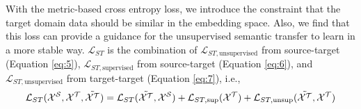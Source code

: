 With the metric-based cross entropy loss, we introduce the constraint that the target domain data should be similar in the embedding space. 
Also, we find that this loss can provide a guidance for the unsupervised semantic transfer to learn in a more stable way.
$\mathcal{L}_{ST}$ is the combination of $\mathcal{L}_{ST, \text{unsupervised}}$ from source-target (Equation \ref{eq:5}), $\mathcal{L}_{ST, \text{supervised}}$ from source-target (Equation \ref{eq:6}), and $\mathcal{L}_{ST, \text{unsupervised}}$ from target-target (Equation \ref{eq:7}), i.e.,
\begin{eqnarray}
\mathcal{L}_{ST}(\mathcal{X}^{\mathcal{S}}, \mathcal{X}^{\mathcal{T}}, \tilde{\mathcal{X}^{\mathcal{T}}})=\mathcal{L}_{ST}(\tilde{\mathcal{X}^{\mathcal{T}}}, \mathcal{X}^{\mathcal{S}})+\mathcal{L}_{ST, \text{sup}}(\mathcal{X}^{\mathcal{T}})+\mathcal{L}_{ST, \text{unsup}}(\tilde{\mathcal{X}^{\mathcal{T}}}, \mathcal{X}^{\mathcal{T}})
\end{eqnarray}







